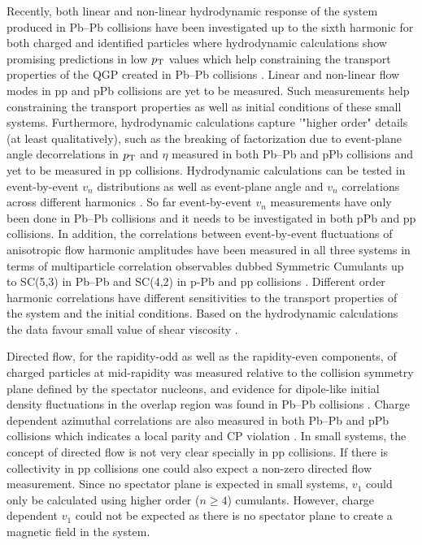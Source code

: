 \documentclass[../report.tex]{subfiles}
\begin{document}
Recently, both linear and non-linear hydrodynamic response of the system produced in Pb--Pb collisions have been investigated up to the sixth harmonic for both charged and identified particles where hydrodynamic calculations show promising predictions in low $p_{\rm{T}}$ values which help constraining the transport properties of the QGP created in Pb--Pb collisions \cite{Acharya:2017zfg}. Linear and non-linear flow modes in pp and pPb collisions are yet to be measured. Such measurements help constraining the transport properties as well as initial conditions of these small systems. Furthermore, hydrodynamic calculations capture '"higher order" details (at least qualitatively), such as the breaking of factorization due to event-plane angle decorrelations in $p_{\rm{T}}$ and $\eta$ measured in both Pb--Pb and pPb collisions \cite{Khachatryan:2015oea,Sirunyan:2017gyb,Acharya:2017ino} and yet to be measured in pp collisions. Hydrodynamic calculations can be tested in event-by-event $v_{n}$ distributions as well as event-plane angle and $v_{n}$ correlations across different harmonics \cite{Aad:2014fla,Aad:2015lwa,ALICE:2016kpq,Sirunyan:2017uyl}. So far event-by-event $v_{n}$ measurements have only been done in Pb--Pb collisions \cite{Aad:2013xma,Sirunyan:2017fts} and it needs to be investigated in both pPb and pp collisions. In addition, the correlations between event-by-event fluctuations of anisotropic flow harmonic amplitudes have been measured in all three systems in terms of multiparticle correlation observables dubbed Symmetric Cumulants up to SC(5,3) in Pb--Pb and SC(4,2) in p-Pb and pp collisions \cite{Sirunyan:2017uyl,Acharya:2017gsw,ATLAS-CONF-2018-012}. Different order harmonic correlations have different sensitivities to the transport properties of the system and the initial conditions. Based on the hydrodynamic calculations the data favour small value of shear viscosity \cite{Zhu:2016puf}.

Directed flow, for the rapidity-odd as well as the rapidity-even components, of charged particles at mid-rapidity was measured relative to the collision symmetry plane defined by the spectator nucleons, and evidence for dipole-like initial density fluctuations in the overlap region was found in Pb--Pb collisions \cite{Abelev:2013cva}. Charge dependent azimuthal correlations are also measured in both Pb--Pb and pPb collisions which indicates a local parity and CP violation \cite{Adam:2015vje,Sirunyan:2017tax,Acharya:2017fau,Sirunyan:2017quh,Khachatryan:2016got}. In small systems, the concept of directed flow is not very clear specially in pp collisions. If there is collectivity in pp collisions one could also expect a non-zero directed flow measurement. Since no spectator plane is expected in small systems, $v_{1}$ could only be calculated using higher order ($n\geq 4$) cumulants. However, charge dependent $v_{1}$ could not be expected as there is no spectator plane to create a magnetic field in the system. 
\end{document}
